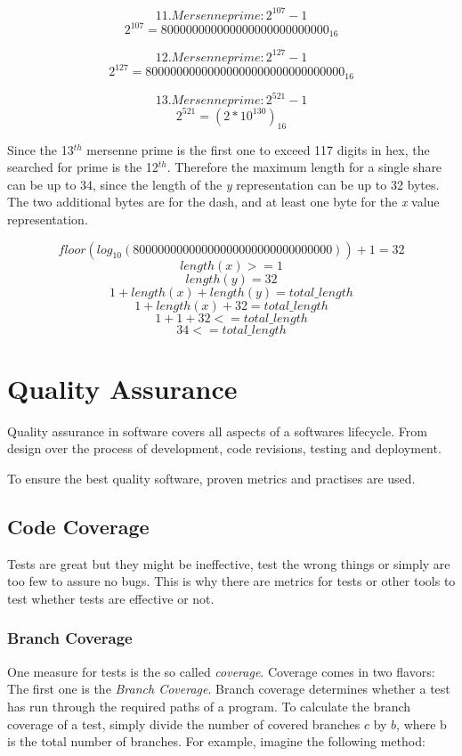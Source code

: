 $$11. Mersenne prime: 2^{107}-1$$
$$2^{107} = 800000000000000000000000000_{16}$$

$$12. Mersenne prime: 2^{127}-1$$
$$2^{127} = 80000000000000000000000000000000_{16}$$

$$13. Mersenne prime: 2^{521}-1$$
$$2^{521} = (2*10^{130})_{16}$$

Since the 13$^{th}$ mersenne prime is the first one to exceed 117 digits in
hex, the searched for prime is the 12$^{th}$. Therefore the maximum length for
a single share can be up to 34, since the length of the \textit{y}
representation can be up to 32 bytes. The two additional bytes are for the
dash, and at least one byte for the \textit{x} value representation.

$$floor(log_{10}(80000000000000000000000000000000)) + 1 = 32$$
$$length(x) >= 1$$
$$length(y) = 32$$
$$1 + length(x) + length(y) = total\_length$$
$$1 + length(x) + 32 = total\_length$$
$$1 + 1 + 32 <= total\_length$$
$$34 <= total\_length$$

\chapter{Quality Assurance}

Quality assurance in software covers all aspects of a softwares lifecycle.
From design over the process of development, code revisions, testing and
deployment.

To ensure the best quality software, proven metrics and practises are used.

\section{Code Coverage}

Tests are great but they might be ineffective, test the wrong things
or simply are too few to assure no bugs. This is why there are metrics
for tests or other tools to test whether tests are effective or not.

\subsection{Branch Coverage}

One measure for tests is the so called \textit{coverage}. Coverage
comes in two flavors: The first one is the \textit{Branch Coverage}.
Branch coverage determines whether a test has run through the
required paths of a program. To calculate the branch coverage of a test,
simply divide the number of covered branches $c$ by $b$, where b is the
total number of branches. For example, imagine the following
method:

